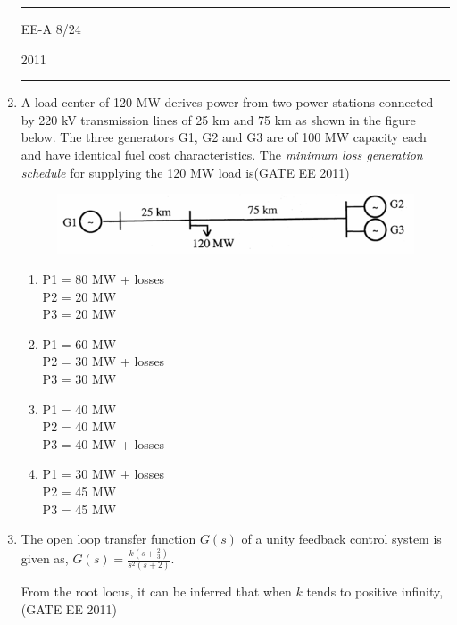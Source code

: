 \documentclass[a4paper,10pt]{exam}
\theoremstyle{remark}
\begin{document}
\begin{enumerate}
\vfill
\noindent\rule{\textwidth}{0.4pt}
\raggedright{EE-A}
\hfill
8/24
\newpage
\raggedright{2011}
\hfill
{}\\

\noindent\rule{\textwidth}{0.4pt}

\item A load center of 120 MW derives power from two power stations connected by 220 kV transmission lines of 25 km and 75 km as shown in the figure below. The three generators G1, G2 and G3 are of 100 MW capacity each and have identical fuel cost characteristics. The \textit{minimum loss generation schedule} for supplying the 120 MW load is\hfill{(GATE EE 2011)}

\begin{figure}[H]
    \centering
    \includegraphics[width=1\columnwidth]{figs/Q 32.png}\caption{}     \label{fig:myfigure}
\end{figure}

\begin{multicols}{2}
\begin{enumerate}
  \item P1 = 80 MW + losses \\
        P2 = 20 MW \\
        P3 = 20 MW
  \item P1 = 60 MW \\
        P2 = 30 MW + losses \\
        P3 = 30 MW
  \item P1 = 40 MW \\
        P2 = 40 MW \\
        P3 = 40 MW + losses
  \item P1 = 30 MW + losses \\
        P2 = 45 MW \\
        P3 = 45 MW
\end{enumerate}
\end{multicols}

\item The open loop transfer function $G(s)$ of a unity feedback control system is given as,
$
G(s) = \frac{k \left(s+\frac{2}{3}\right)}{s^{2}(s+2)}.
$

From the root locus, it can be inferred that when $k$ tends to positive infinity,\hfill{(GATE EE 2011)}



\end{enumerate}
\end{document}

